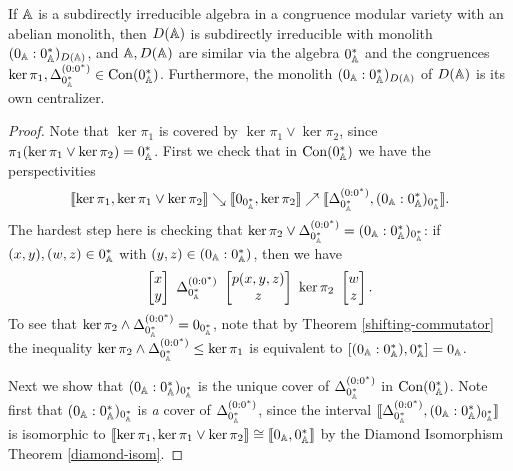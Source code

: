 \documentclass[letterpaper,11pt]{article}
\DeclareMathOperator{\Con}{Con}
\begin{document}
\begin{prop} If $\mathbb{A}$ is a subdirectly irreducible algebra in a congruence modular variety with an abelian monolith, then $D(\mathbb{A})$ is subdirectly irreducible with monolith $(0_{\mathbb{A}}:0_{\mathbb{A}}^*)_{D(\mathbb{A})}$, and $\mathbb{A}, D(\mathbb{A})$ are similar via the algebra $0_{\mathbb{A}}^*$ and the congruences $\ker \pi_1, \Delta_{0_\bA^*}^{(0:0^*)} \in \Con(0_\bA^*)$. Furthermore, the monolith $(0_{\mathbb{A}}:0_{\mathbb{A}}^*)_{D(\mathbb{A})}$ of $D(\mathbb{A})$ is its own centralizer.
\end{prop}
\begin{proof} Note that $\ker \pi_1$ is covered by $\ker \pi_1 \vee \ker \pi_2$, since $\pi_1(\ker \pi_1 \vee \ker \pi_2) = 0_{\mathbb{A}}^*$. First we check that in $\Con(0_\bA^*)$ we have the perspectivities
\[
\llbracket \ker \pi_1, \ker \pi_1 \vee \ker \pi_2\rrbracket \searrow \llbracket 0_{0_{\mathbb{A}}^*}, \ker \pi_2 \rrbracket \nearrow \llbracket \Delta_{0_{\mathbb{A}}^*}^{(0:0^*)}, (0_{\mathbb{A}} : 0_{\mathbb{A}}^*)_{0_{\mathbb{A}}^*}\rrbracket.
\]
The hardest step here is checking that $\ker \pi_2 \vee \Delta_{0_{\mathbb{A}}^*}^{(0:0^*)} = (0_{\mathbb{A}} : 0_{\mathbb{A}}^*)_{0_{\mathbb{A}}^*}$: if $(x,y), (w,z) \in 0_{\mathbb{A}}^*$ with $(y,z) \in (0_{\mathbb{A}} : 0_{\mathbb{A}}^*)$, then we have
\[
\begin{bmatrix} x \\ y \end{bmatrix}\ \Delta_{0_\bA^*}^{(0:0^*)}\ \begin{bmatrix} p(x,y,z)\\ z\end{bmatrix}\ \ker \pi_2\ \begin{bmatrix} w\\ z\end{bmatrix}.
\]
To see that $\ker \pi_2 \wedge \Delta_{0_{\mathbb{A}}^*}^{(0:0^*)} = 0_{0_{\mathbb{A}}^*}$, note that by Theorem \ref{shifting-commutator} the inequality $\ker \pi_2 \wedge \Delta_{0_{\mathbb{A}}^*}^{(0:0^*)} \le \ker \pi_1$ is equivalent to $[(0_{\mathbb{A}}:0_{\mathbb{A}}^*),0_{\mathbb{A}}^*] = 0_{\mathbb{A}}$.

Next we show that $(0_{\mathbb{A}} : 0_{\mathbb{A}}^*)_{0_{\mathbb{A}}^*}$ is the unique cover of $\Delta_{0_{\mathbb{A}}^*}^{(0:0^*)}$ in $\Con(0_\bA^*)$. Note first that $(0_{\mathbb{A}} : 0_{\mathbb{A}}^*)_{0_{\mathbb{A}}^*}$ is \emph{a} cover of $\Delta_{0_{\mathbb{A}}^*}^{(0:0^*)}$, since the interval $\llbracket \Delta_{0_{\mathbb{A}}^*}^{(0:0^*)}, (0_{\mathbb{A}} : 0_{\mathbb{A}}^*)_{0_{\mathbb{A}}^*}\rrbracket$ is isomorphic to $\llbracket \ker \pi_1, \ker \pi_1 \vee \ker \pi_2\rrbracket \cong \llbracket 0_{\mathbb{A}}, 0_{\mathbb{A}}^* \rrbracket$ by the Diamond Isomorphism Theorem \ref{diamond-isom}.


\end{proof}
\end{document}
